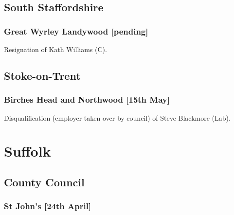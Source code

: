 \documentclass[a4paper,openany]{book}
\begin{document}
\begin{resultsiii}
\subsection*{South Staffordshire}

\subsubsection*{Great Wyrley Landywood \hspace*{\fill}\nolinebreak[1]%
	\enspace\hspace*{\fill}
	[pending]}


Resignation of Kath Williams (C).

\subsection*{Stoke-on-Trent}

\subsubsection*{Birches Head and Northwood \hspace*{\fill}\nolinebreak[1]%
	\enspace\hspace*{\fill}
	[15th May]}


Disqualification (employer taken over by council) of Steve Blackmore (Lab).

\section{Suffolk}

\subsection*{County Council}

\subsubsection*{St John's \hspace*{\fill}\nolinebreak[1]%
	\enspace\hspace*{\fill}
	[24th April]}


\end{resultsiii}
\end{document}
